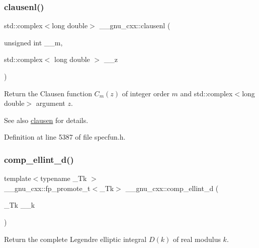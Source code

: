 \subsubsection{\texorpdfstring{clausenl()}{clausenl()}\hspace{0.1cm}{\footnotesize\ttfamily [2/2]}}
{\footnotesize\ttfamily std\+::complex$<$long double$>$ \+\_\+\+\_\+gnu\+\_\+cxx\+::clausenl (\begin{DoxyParamCaption}\item[{unsigned int}]{\+\_\+\+\_\+m,  }\item[{std\+::complex$<$ long double $>$}]{\+\_\+\+\_\+z }\end{DoxyParamCaption})\hspace{0.3cm}{\ttfamily [inline]}}

Return the Clausen function $ C_m(z) $ of integer order $ m $ and {\ttfamily std\+::complex$<$long double$>$} argument $ z $.

\begin{DoxySeeAlso}{See also}
\hyperlink{group__gnu__math__spec__func_ga54e4ba71b1f81718d6998349f91ff88f}{clausen} for details. 
\end{DoxySeeAlso}


Definition at line 5387 of file specfun.\+h.

\mbox{\label{group__gnu__math__spec__func_ga3fe79a91524b43ffc5ffb83c0eb2bd00}} 
\subsubsection{\texorpdfstring{comp\+\_\+ellint\+\_\+d()}{comp\_ellint\_d()}}
{\footnotesize\ttfamily template$<$typename \+\_\+\+Tk $>$ \\
\+\_\+\+\_\+gnu\+\_\+cxx\+::fp\+\_\+promote\+\_\+t$<$\+\_\+\+Tk$>$ \+\_\+\+\_\+gnu\+\_\+cxx\+::comp\+\_\+ellint\+\_\+d (\begin{DoxyParamCaption}\item[{\+\_\+\+Tk}]{\+\_\+\+\_\+k }\end{DoxyParamCaption})\hspace{0.3cm}{\ttfamily [inline]}}

Return the complete Legendre elliptic integral $ D(k) $ of real modulus $ k $.

